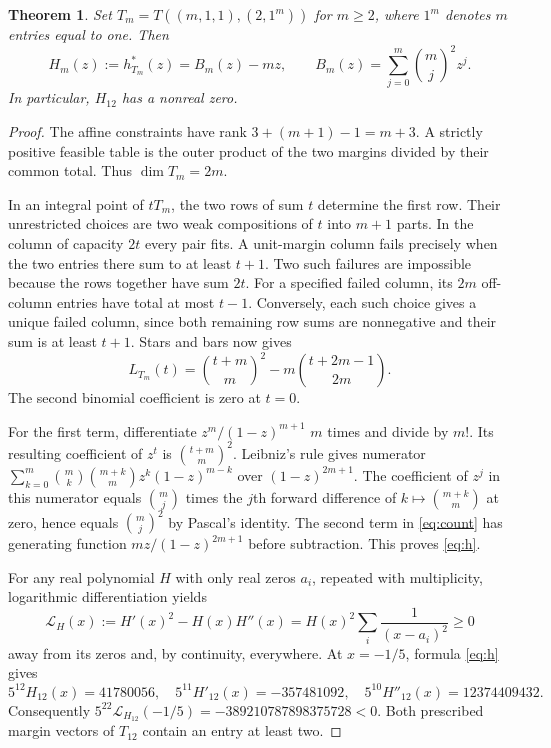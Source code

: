 \documentclass[11pt]{article}
\newtheorem{theorem}{Theorem}
\newcommand{\Lag}{\mathcal L}
\begin{document}
\begin{theorem}\label{thm:counter}
Set $T_m=T((m,1,1),(2,1^m))$ for $m\ge2$, where $1^m$ denotes $m$ entries equal to one. Then
\begin{equation}\label{eq:h}
 H_m(z):=h^*_{T_m}(z)=B_m(z)-mz,\qquad B_m(z)=\sum_{j=0}^m\binom mj^2z^j.
\end{equation}
In particular, $H_{12}$ has a nonreal zero.
\end{theorem}
\begin{proof}
The affine constraints have rank $3+(m+1)-1=m+3$. A strictly positive feasible table is the outer product of the two margins divided by their common total. Thus $\dim T_m=2m$.

In an integral point of $tT_m$, the two rows of sum $t$ determine the first row. Their unrestricted choices are two weak compositions of $t$ into $m+1$ parts. In the column of capacity $2t$ every pair fits. A unit-margin column fails precisely when the two entries there sum to at least $t+1$. Two such failures are impossible because the rows together have sum $2t$. For a specified failed column, its $2m$ off-column entries have total at most $t-1$. Conversely, each such choice gives a unique failed column, since both remaining row sums are nonnegative and their sum is at least $t+1$. Stars and bars now gives
\begin{equation}\label{eq:count}
 L_{T_m}(t)=\binom{t+m}{m}^2-m\binom{t+2m-1}{2m}.
\end{equation}
The second binomial coefficient is zero at $t=0$.

For the first term, differentiate $z^m/(1-z)^{m+1}$ $m$ times and divide by $m!$. Its resulting coefficient of $z^t$ is $\binom{t+m}{m}^2$. Leibniz's rule gives numerator $\sum_{k=0}^m\binom mk\binom{m+k}m z^k(1-z)^{m-k}$ over $(1-z)^{2m+1}$. The coefficient of $z^j$ in this numerator equals $\binom mj$ times the $j$th forward difference of $k\mapsto\binom{m+k}m$ at zero, hence equals $\binom mj^2$ by Pascal's identity. The second term in \eqref{eq:count} has generating function $mz/(1-z)^{2m+1}$ before subtraction. This proves \eqref{eq:h}.

For any real polynomial $H$ with only real zeros $a_i$, repeated with multiplicity, logarithmic differentiation yields
\[
  \Lag_H(x):=H'(x)^2-H(x)H''(x)=H(x)^2\sum_i\frac{1}{(x-a_i)^2}\ge0
\]
away from its zeros and, by continuity, everywhere. At $x=-1/5$, formula \eqref{eq:h} gives
\[
  5^{12}H_{12}(x)=41780056,\quad
  5^{11}H'_{12}(x)=-357481092,\quad
  5^{10}H''_{12}(x)=12374409432.
\]
Consequently $5^{22}\Lag_{H_{12}}(-1/5)=-389210787898375728<0$. Both prescribed margin vectors of $T_{12}$ contain an entry at least two.
\end{proof}
\end{document}
